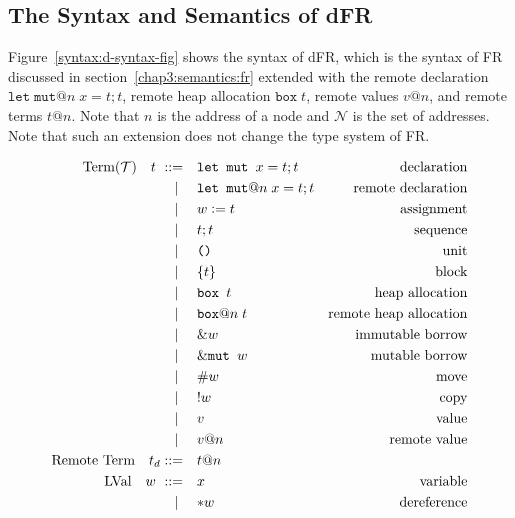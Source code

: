 \subsection{The Syntax and Semantics of dFR} 
\label{chap3:semantics:dfr}
Figure~\ref{syntax:d-syntax-fig} shows the syntax of dFR, which is the syntax of FR discussed in section~\ref{chap3:semantics:fr} extended with the remote declaration $\texttt{let}\;\texttt{mut}@n\; x = t;t$, remote heap allocation $\texttt{box}\;t$, remote values $v@n$, and remote terms $t@n$. Note that $n$ is the address of a node and $\mathcal{N}$ is the set of addresses. Note that such an extension does not change the type system of FR.
\begin{figure}
\begin{alignat*}{3}
    \text{Term}(\mathcal{T}) \quad t \ \metaDeff \quad &\texttt{let mut } x = t;t &\text{declaration}\\
    \cmid \quad &\texttt{let mut}@n\; x = t;t &\text{remote declaration}\\
    \cmid \quad &w \metaDef t &\text{assignment}\\
    \cmid \quad &t;t &\text{sequence}\\
    \cmid \quad &\texttt{()} &\text{unit}\\
    \cmid \quad &\{t\} &\text{block}\\
    \cmid \quad &\texttt{box } t &\text{heap allocation}\\
    \cmid \quad &\texttt{box}@n\; t &\text{remote  heap allocation}\\
    \cmid \quad &\&w \quad &\text{immutable borrow} \\
    \cmid \quad &\&\texttt{mut } w \quad &\text{mutable borrow} \\
    \cmid \quad &\#{w} \quad &\text{move} \\
    \cmid \quad &!{w} \quad &\text{copy} \\
    \cmid \quad &v \quad &\text{value} \\
    \cmid \quad &v@n \quad &\text{remote value}\\
    \text{Remote Term} \quad t_d \metaDeff \quad &t@n\\
    \text{LVal} \quad w \ \metaDeff \quad &x \quad &\text{variable} \\
    \cmid \quad &{*}w \quad &\text{dereference} \\

\end{alignat*}
\end{figure}
